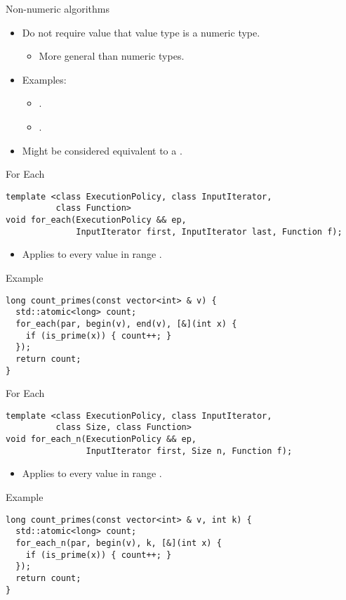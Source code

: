 \begin{frame}[t]{Non-numeric algorithms}
\begin{itemize}
  \item Do not require value that value type is a numeric type.
    \begin{itemize}
      \item More general than numeric types.
    \end{itemize}

  \vfill
  \item Examples:
    \begin{itemize}
      \item {}.
      \item {}.
    \end{itemize}

  \vfill
  \item Might be considered equivalent to a .
\end{itemize}
\end{frame}

\begin{frame}[t,fragile]{For Each}
\begin{lstlisting}[]
template <class ExecutionPolicy, class InputIterator, 
          class Function>
void for_each(ExecutionPolicy && ep, 
              InputIterator first, InputIterator last, Function f);
\end{lstlisting}
\begin{itemize}
  \item Applies  to every value in range \cppid{[first,last)}.
\end{itemize}
\begin{block}{Example}
\begin{lstlisting}[basicstyle=\scriptsize]
long count_primes(const vector<int> & v) {
  std::atomic<long> count;
  for_each(par, begin(v), end(v), [&](int x) {
    if (is_prime(x)) { count++; }
  });
  return count;
}
\end{lstlisting}
\end{block}
\end{frame}

\begin{frame}[t,fragile]{For Each}
\begin{lstlisting}[]
template <class ExecutionPolicy, class InputIterator, 
          class Size, class Function>
void for_each_n(ExecutionPolicy && ep, 
                InputIterator first, Size n, Function f);
\end{lstlisting}
\begin{itemize}
  \item Applies  to every value in range \cppid{[first,first+n)}.
\end{itemize}
\begin{block}{Example}
\begin{lstlisting}[basicstyle=\scriptsize]
long count_primes(const vector<int> & v, int k) {
  std::atomic<long> count;
  for_each_n(par, begin(v), k, [&](int x) {
    if (is_prime(x)) { count++; }
  });
  return count;
}
\end{lstlisting}
\end{block}
\end{frame}


